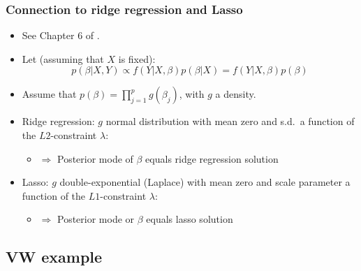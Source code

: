 \documentclass[xcolor=table,10pt]{beamer}
\begin{document}
\begin{frame}
  \frametitle{Connection to ridge regression and Lasso}
  \begin{itemize}
  \item See Chapter 6 of \citep{James2013}.
  \item Let (assuming that $X$ is fixed):
    \begin{equation*}
      p(\beta|X,Y)\propto f(Y|X,\beta) p(\beta|X) = f(Y|X,\beta)p(\beta)
    \end{equation*}
    \vspace*{-\baselineskip}
  \item Assume that $p(\beta) = \prod_{j=1}^p g(\beta_j)$, with $g$ a
    density.
  \item \alert{Ridge regression}: $g$ normal distribution with mean
    zero and s.d.\ a function of the $L2$-constraint $\lambda$:
    \begin{itemize}
    \item $\Rightarrow$ Posterior mode of $\beta$ equals ridge
      regression solution
    \end{itemize}
  \item \alert{Lasso}: $g$ double-exponential (Laplace) with mean zero
    and scale parameter a function of the $L1$-constraint $\lambda$:
    \begin{itemize}
    \item $\Rightarrow$ Posterior mode or $\beta$ equals lasso
      solution 
    \end{itemize}
  \end{itemize}
\end{frame}



\subsection{VW example}





\end{document}

